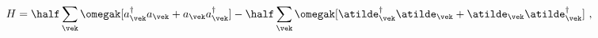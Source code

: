 \begin{equation}
  H = \half \sum_{\vek}
   \omegak [a^\dagger_{\vek}a_{\vek}+a_{\vek}a^{\dagger}_{\vek}]
   -\half \sum_{\vek}
   \omegak [\atilde^\dagger_{\vek}\atilde_{\vek}
   +\atilde_{\vek}\atilde^{\dagger}_{\vek}] \ ,
\end{equation}

